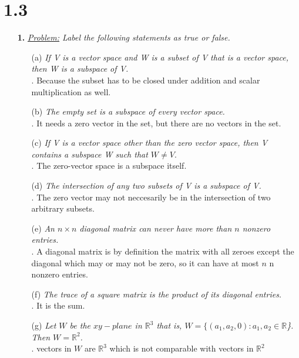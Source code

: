 \documentclass[11pt, fleqn]{article}
\begin{document}
\section*{1.3}
\begin{itemize}
    \setlength\itemsep{5ex}
    \item [\textbf{1.}]\textit{\underline{Problem:} Label the following statements as true or false.}
    	\begin{itemize}
    		\item[(a)]\textit{If V is a vector space and W is a subset of V that is a vector space,
			then W is a subspace of V.}\\[1ex]. Because the subset has to be closed under addition and scalar multiplication as well.

    		\item[(b)] \textit{The empty set is a subspace of every vector space.}\\[1ex]. It needs a zero vector in the set, but there are no vectors in the set.

    		\item[(c)] \textit{If V is a vector space other than the zero vector space, then V
			contains a subspace W such that $W \neq V.$}\\[1ex]. The zero-vector space is a subspace itself.

    		\item[(d)] \textit{The intersection of any two subsets of V is a subspace of V.}\\[1ex]. The zero vector may not neccesarily be in the intersection of two arbitrary subsets.

    		\item[(e)] \textit{An $n \times n$ diagonal matrix can never have more than $n$ nonzero
			entries.}\\[1ex]. A diagonal matrix is by definition the matrix with all zeroes except the diagonal which may or may not be zero, so it can have at most $n$ n nonzero entries.

    		\item[(f)] \textit{The trace of a square matrix is the product of its diagonal entries.}\\[1ex]. It is the sum.

    		\item[(g)] \textit{Let $W$ be the $xy-plane$ in $\mathbb{R}^3$ that is, $W = \{(a_1, a_2, 0): a_1, a_2 \in \mathbb{R}$\}. Then $W = \mathbb{R}^2$.}
    		\\[1ex]. vectors in $W$ are $\mathbb{R}^3$ which is not comparable with vectors in $\mathbb{R}^2$
    	\end{itemize}


\end{itemize}
\end{document}
